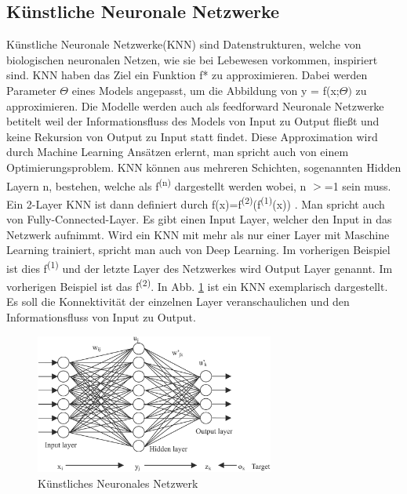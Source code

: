 \documentclass{llncs}
\begin{document}
\subsection{Künstliche Neuronale Netzwerke}
Künstliche Neuronale Netzwerke(KNN) sind Datenstrukturen, welche von biologischen neuronalen Netzen, wie sie bei Lebewesen vorkommen, inspiriert sind. KNN haben das Ziel ein Funktion f* zu approximieren. Dabei werden Parameter $\Theta$ eines Models angepasst, um die Abbildung von y = f(x;$\Theta)$ zu approximieren. Die Modelle werden auch als feedforward Neuronale Netzwerke betitelt weil der Informationsfluss des Models von Input zu Output fließt und keine Rekursion von Output zu Input statt findet. Diese Approximation wird durch Machine Learning Ansätzen erlernt, man spricht auch von einem Optimierungsproblem. KNN können aus mehreren Schichten, sogenannten Hidden Layern n, bestehen, welche als f\textsuperscript{(n)} dargestellt werden wobei, n $>$=1 sein muss. Ein 2-Layer KNN ist dann definiert durch f(x)=f\textsuperscript{(2)}(f\textsuperscript{(1)}(x)) \cite{Grundlagen}. Man spricht auch von Fully-Connected-Layer. Es gibt einen Input Layer, welcher den Input in das Netzwerk aufnimmt. Wird ein KNN mit mehr als nur einer Layer mit Maschine Learning trainiert, spricht man auch von Deep Learning. Im vorherigen Beispiel ist dies f\textsuperscript{(1)} und der letzte Layer des Netzwerkes wird Output Layer genannt. Im vorherigen Beispiel ist das f\textsuperscript{(2)}. In Abb. \ref{fig:Bild1} ist ein KNN exemplarisch dargestellt. Es soll die Konnektivität der einzelnen Layer veranschaulichen und den Informationsfluss von Input zu Output.
\newpage
\begin{figure}[htbp]
	\centering
	\includegraphics[width=0.7\textwidth]{neuronalesnetzwerk.png}
	\caption{Künstliches Neuronales Netzwerk\protect\cite{annpic}}
	\label{fig:Bild1}
\end{figure}
~\\\\
\end{document}
